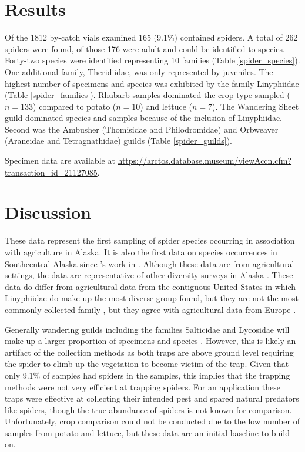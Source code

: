 \section{Results}
Of the 1812 by-catch vials examined 165 (9.1\%) contained spiders. A total of 262 spiders were found, of those 176 were adult and could be identified to species. Forty-two species were identified representing 10 families (Table \ref{spider_species}). One additional family, Theridiidae, was only represented by juveniles. The highest number of specimens and species was exhibited by the family Linyphiidae (Table \ref{spider_families}). Rhubarb samples dominated the crop type sampled ($n=133$) compared to potato ($n=10$) and lettuce ($n=7$). The Wandering Sheet guild dominated species and samples because of the inclusion of Linyphiidae. Second was the Ambusher (Thomisidae and Philodromidae) and Orbweaver (Araneidae and Tetragnathidae) guilds (Table \ref{spider_guilds}). 

Specimen data are available at \url{https://arctos.database.museum/viewAccn.cfm?transaction_id=21127085}.







\section{Discussion}

These data represent the first sampling of spider species occurring in association with agriculture in Alaska. It is also the first data on species occurrences in Southcentral Alaska since \citeauthor{ChamberlinIvie1947}’s work in \citeyear{ChamberlinIvie1947}. Although these data are from agricultural settings, the data are representative of other diversity surveys in Alaska \citep{Slowik2006, SlowikBlagoev2012, Sikesetal2013}.  These data do differ from agricultural data from the contiguous United States in which Linyphiidae do make up the most diverse group found, but they are not the most commonly collected family \citep{YoungEdwards1990}, but they agree with agricultural data from Europe \citep{NyffelerBirkhofer2017}. 

Generally wandering guilds including the families Salticidae and Lycosidae will make up a larger proportion of specimens and species \citep{YoungEdwards1990, Kerzicniketal2013}. However, this is likely an artifact of the collection methods as both traps are above ground level requiring the spider to climb up the vegetation to become victim of the trap. Given that only 9.1\% of samples had spiders in the samples, this implies that the trapping methods were not very efficient at trapping spiders. For an  application these traps were effective at collecting their intended pest and spared natural predators like spiders, though the true abundance of spiders is not known for comparison. Unfortunately, crop comparison could not be conducted due to the low number of samples from potato and lettuce, but these data are an initial baseline to build on. 

